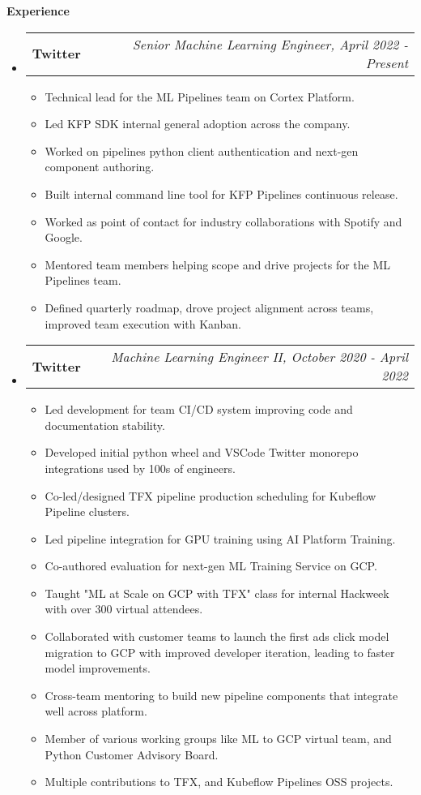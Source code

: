 \documentclass[letterpaper,10pt]{article}
\makeatletter
\newcommand{\resitem}[1]{\item #1 \vspace{-2pt}}
\newcommand{\resheading}[1]{{\large \colorbox{mygrey}{\begin{minipage}{\textwidth}{\textbf{#1 \vphantom{p\^{E}}}}\end{minipage}}}}
\newcommand{\ressubheading}[4]{
\begin{tabular*}{7.0in}{l@{\extracolsep{\fill}}r}
		\textbf{#1} & \textit{#4} \\
\end{tabular*}\vspace{-6pt}}
\makeatother
\begin{document}
\resheading{Experience}
	\begin{itemize}
		\item
			\ressubheading{Twitter}{Boulder, CO}{Senior Machine Learning Engineer}{Senior Machine Learning Engineer, April 2022 - Present}
			\begin{itemize}
				\resitem{Technical lead for the ML Pipelines team on Cortex Platform.} 

				\resitem{Led KFP SDK internal general adoption across the company.}
				\resitem{Worked on pipelines python client authentication and  next-gen component authoring.}
				\resitem{Built internal command line tool for KFP Pipelines continuous release.}
				\resitem{Worked as point of contact for industry collaborations with Spotify and Google.}
				\resitem{Mentored team members helping scope and drive projects for the ML Pipelines team.}
				\resitem{Defined quarterly roadmap, drove project alignment across teams, improved team execution with Kanban.}
				
			\end{itemize}
		\item
			\ressubheading{Twitter}{Boulder, CO}{Machine Learning Engineer II}{Machine Learning Engineer II, October 2020 - April 2022}
			\begin{itemize}
				\resitem{Led development for team CI/CD system improving code and documentation stability. } 

				\resitem{Developed initial python wheel and VSCode Twitter monorepo integrations used by 100s of engineers.}
				\resitem{Co-led/designed TFX pipeline production scheduling for Kubeflow Pipeline clusters.}
				\resitem{Led pipeline integration for GPU training using AI Platform Training.}
				\resitem{Co-authored evaluation for next-gen ML Training Service on GCP.}
				\resitem{Taught "ML at Scale on GCP with TFX" class for internal Hackweek with over 300 virtual attendees.}
				\resitem{Collaborated with customer teams to launch the first ads click model migration to GCP with improved developer iteration, leading to faster model improvements.}
			    \resitem{Cross-team mentoring to build new pipeline components that integrate well across platform.}
				\resitem{Member of various working groups like ML to GCP virtual team, and Python Customer Advisory Board.}
				\resitem{Multiple contributions to TFX, and Kubeflow Pipelines OSS projects.}


\end{itemize}
\end{itemize}
\end{document}
